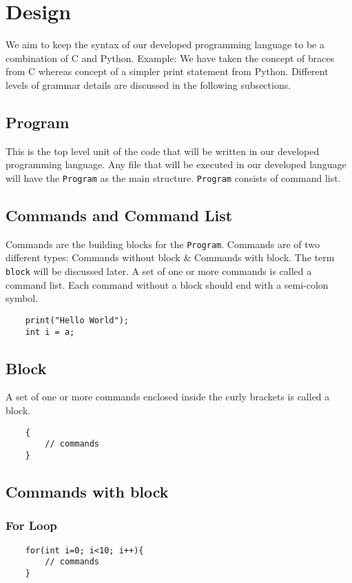 \documentclass[12pt,letterpaper]{article}
\begin{document}
\section{Design}
We aim to keep the syntax of our developed programming language to be a combination of C and Python. Example: We have taken the concept of braces from C whereas concept of a simpler print statement from Python. Different levels of grammar details are discussed in the following subsections.

\subsection{Program}
This is the top level unit of the code that will be written in our developed programming language. Any file that will be executed in our developed language will have the \texttt{Program} as the main structure.
\texttt{Program} consists of command list.

\subsection{Commands and Command List}
Commands are the building blocks for the \texttt{Program}. Commands are of two different types: Commands without block \& Commands with block. The term \texttt{block} will be discussed later. A set of one or more commands is called a command list. Each command without a block should end with a semi-colon symbol.
\begin{verbatim}
    print("Hello World");
    int i = a;
\end{verbatim}

\subsection{Block}
A set of one or more commands enclosed inside the curly brackets is called a block.

\begin{verbatim}
    {
        // commands
    }
\end{verbatim}

\subsection{Commands with block}
\subsubsection{For Loop}
\begin{verbatim}
    for(int i=0; i<10; i++){
        // commands
    }
\end{verbatim}
\end{document}
